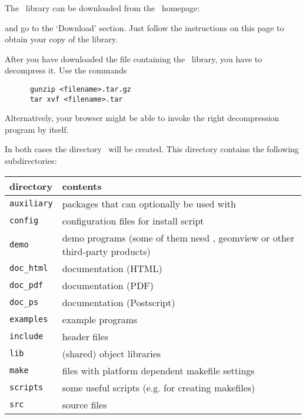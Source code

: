 The \cgal\ library can be downloaded from the \cgal\ 
homepage:
\begin{quote}
      \cgalhomepage
\end{quote}
and go to the `Download' section. Just follow the instructions on this
page to obtain your copy of the library.

After you have downloaded the file containing the \cgal\ library, you
have to decompress it. Use the commands

\begin{verbatim}
      gunzip <filename>.tar.gz
      tar xvf <filename>.tar
\end{verbatim}

Alternatively, your browser might be able to invoke the right
decompression program by itself.

In both cases the directory \cgaldir\ will be created. This directory
contains the following subdirectories:\index{directories!structure}

\begin{center}
  \renewcommand{\arraystretch}{1.3}
  \gdef\lcTabularBorder{2}
  \begin{tabular}{|l|l|} \hline
    \textbf{directory} & \textbf{contents}\\\hline\hline
    \texttt{auxiliary} & packages that can optionally be used with \cgal\\\hline
    \texttt{config}    & configuration files for install script\\\hline
    \texttt{demo}      & demo programs (some of them need \leda, geomview
                         or other third-party products)\\\hline
    \texttt{doc\_html} & documentation (HTML)\\\hline
    \texttt{doc\_pdf}  & documentation (PDF)\\\hline
    \texttt{doc\_ps}   & documentation (Postscript)\\\hline
    \texttt{examples}  & example programs\\\hline
    \texttt{include}   & header files\\\hline
    \texttt{lib}       & (shared) object libraries\\\hline
    \texttt{make}      & files with platform dependent makefile settings\\\hline
    \texttt{scripts}   & some useful scripts (e.g. for creating makefiles)\\\hline
    \texttt{src}       & source files\\\hline
  \end{tabular}
\end{center}

